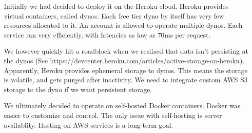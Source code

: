 Initially we had decided to deploy it on the Heroku cloud. Heroku provides virtual containers, called dynos. Each free tier dyno 
by itself has very few resources allocated to it. An account is allowed to operate multiple dynos. Each service ran very efficiently, 
with latencies as low as 70ms per request.

We however quickly hit a roadblock when we realised that data isn't persisting at the dynos (See https://devcenter.heroku.com/articles/active-storage-on-heroku). 
Apparently, Heroku provides ephemeral storage to dynos. This means the storage is volatile, and gets purged after inactivity.
We need to integrate custom AWS S3 storage to the dyno if we want persistent storage. 

We ultimately decided to operate on self-hosted Docker containers. Docker was easier to customize and control. 
The only issue with self-hosting is server availablity. Hosting on AWS services is a long-term goal.